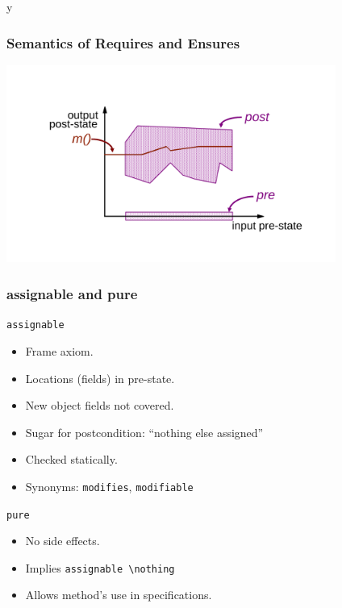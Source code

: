\if y\MAKEHANDOUTS \documentclass[compress,landscape,handout]{beamer}
\begin{document}
\begin{frame}
\frametitle{Semantics of Requires and Ensures}
\includegraphics[width=4.25in]{correctimpl}
\end{frame}

\begin{frame}[fragile]
\frametitle{assignable and pure}

\lstinline!assignable!
\begin{itemize}
\item
Frame axiom.

\item
Locations (fields) in pre-state.

\item
New object fields not covered.

\item
Sugar for postcondition: ``nothing else assigned''

\item
Checked statically.

\item
Synonyms: \lstinline!modifies!, \lstinline!modifiable!
\end{itemize}

\lstinline!pure!
\begin{itemize}
\item
No side effects.

\item
Implies \lstinline!assignable \nothing!

\item
Allows method's use in specifications.
\end{itemize}
\end{frame}
\end{document}
